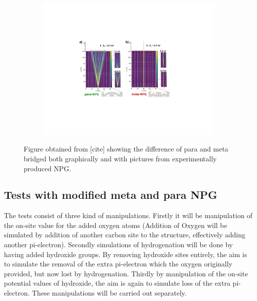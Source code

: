 \begin{figure}
\begin{subfigure}[b]{\textwidth}
    \includegraphics[width = \textwidth]{Figures/Fig_3.pdf}
    \caption{}
    \label{studyfig3}
    \end{subfigure}
    \caption{Figure obtained from [cite] showing the difference of para and meta bridged both graphically and with pictures from experimentally produced NPG.}
    \label{metapara}
\end{figure}
\subsection{Tests with modified meta and para NPG}
The tests consist of three kind of manipulations. Firstly it will be manipulation of the on-site value for the added oxygen atoms (Addition of Oxygen will be simulated by addition of another carbon site to the structure, effectively adding another pi-electron). Secondly simulations of hydrogenation will be done by having added hydroxide groups. By removing hydroxide sites entirely, the aim is to simulate the removal of the extra pi-electron which the oxygen originally provided, but now lost by hydrogenation. Thirdly by manipulation of the on-site potential values of hydroxide, the aim is again to simulate loss of the extra pi-electron. These manipulations will be carried out separately. \\
